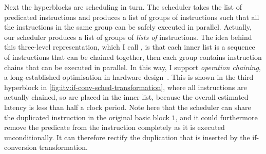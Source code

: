 Next the hyperblocks are scheduling in turn. The scheduler takes the list of
predicated instructions and produces a list of groups of instructions such that
all the instructions in the same group can be safely executed in parallel.
Actually, our scheduler produces a list of groups of \emph{lists of}
instructions.  The idea behind this three-level representation, which I call
\rtlpar, is that each inner list is a sequence of instructions that can be
chained together, then each group contains instruction chains that can be
executed in parallel. In this way, I support \emph{operation chaining}, a
long-established optimisation in hardware
design~\cite[p.~1101]{pangrle87_desig_tools_intel_silic_compil}.  This is shown
in the third hyperblock in \cref{fig:itv:if-conv-sched-transformation}, where
all instructions are actually chained, so are placed in the inner list, because
the overall estimated latency is less than half a clock period.  Note here that
the scheduler can share the duplicated instruction in the original basic block
\texttt{1}, and it could furthermore remove the predicate from the instruction
completely as it is executed unconditionally.  It can therefore rectify the
duplication that is inserted by the if-conversion transformation.

